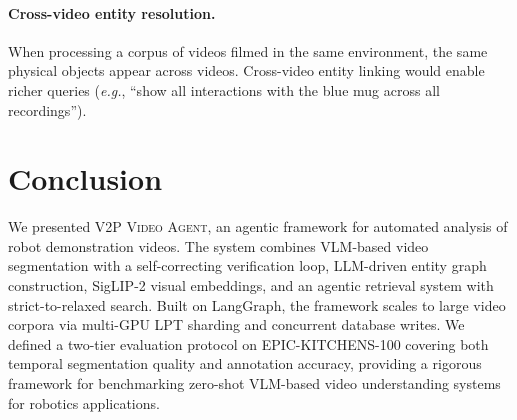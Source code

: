 \documentclass[10pt,twocolumn]{article}
\newcommand{\eg}{\textit{e.g.}}
\newcommand{\sys}{\textsc{V2P Video Agent}}
\begin{document}
\paragraph{Cross-video entity resolution.}
When processing a corpus of videos filmed in the same environment,
the same physical objects appear across videos.  Cross-video entity
linking would enable richer queries (\eg, ``show all interactions
with the blue mug across all recordings'').


\section{Conclusion}\label{sec:conclusion}

We presented \sys{}, an agentic framework for automated analysis
of robot demonstration videos.  The system combines VLM-based
video segmentation with a self-correcting verification loop,
LLM-driven entity graph construction, SigLIP-2 visual embeddings,
and an agentic retrieval system with strict-to-relaxed search.
Built on LangGraph, the framework scales to large video corpora
via multi-GPU LPT sharding and concurrent database writes.
We defined a two-tier evaluation protocol on EPIC-KITCHENS-100
covering both temporal segmentation quality and annotation
accuracy, providing a rigorous framework for benchmarking
zero-shot VLM-based video understanding systems for robotics
applications.
\end{document}
